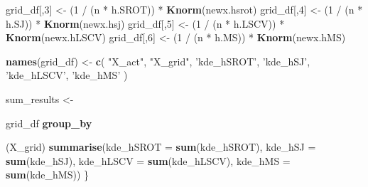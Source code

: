 \documentclass[]{article}
\newenvironment{Shaded}{\begin{snugshade}}{\end{snugshade}}
\newcommand{\KeywordTok}[1]{\textcolor[rgb]{0.13,0.29,0.53}{\textbf{{#1}}}}
\newcommand{\DataTypeTok}[1]{\textcolor[rgb]{0.13,0.29,0.53}{{#1}}}
\newcommand{\DecValTok}[1]{\textcolor[rgb]{0.00,0.00,0.81}{{#1}}}
\newcommand{\StringTok}[1]{\textcolor[rgb]{0.31,0.60,0.02}{{#1}}}
\newcommand{\NormalTok}[1]{{#1}}
\begin{document}
\begin{Shaded}
\begin{Highlighting}[]
        \NormalTok{grid_df[,}\DecValTok{3}\NormalTok{] <-}\StringTok{ }\NormalTok{(}\DecValTok{1} \NormalTok{/}\StringTok{ }\NormalTok{(n *}\StringTok{ }\NormalTok{h.SROT)) *}\StringTok{ }\KeywordTok{Knorm}\NormalTok{(newx.hsrot)}
        \NormalTok{grid_df[,}\DecValTok{4}\NormalTok{] <-}\StringTok{ }\NormalTok{(}\DecValTok{1} \NormalTok{/}\StringTok{ }\NormalTok{(n *}\StringTok{ }\NormalTok{h.SJ)) *}\StringTok{ }\KeywordTok{Knorm}\NormalTok{(newx.hsj)}
        \NormalTok{grid_df[,}\DecValTok{5}\NormalTok{] <-}\StringTok{ }\NormalTok{(}\DecValTok{1} \NormalTok{/}\StringTok{ }\NormalTok{(n *}\StringTok{ }\NormalTok{h.LSCV)) *}\StringTok{ }\KeywordTok{Knorm}\NormalTok{(newx.hLSCV)}
        \NormalTok{grid_df[,}\DecValTok{6}\NormalTok{] <-}\StringTok{ }\NormalTok{(}\DecValTok{1} \NormalTok{/}\StringTok{ }\NormalTok{(n *}\StringTok{ }\NormalTok{h.MS)) *}\StringTok{ }\KeywordTok{Knorm}\NormalTok{(newx.hMS)}
        
        
        \KeywordTok{names}\NormalTok{(grid_df) <-}\StringTok{ }\KeywordTok{c}\NormalTok{(}
            \StringTok{"X_act"}\NormalTok{, }
            \StringTok{"X_grid"}\NormalTok{, }
            \StringTok{'kde_hSROT'}\NormalTok{,}
            \StringTok{'kde_hSJ'}\NormalTok{,}
            \StringTok{'kde_hLSCV'}\NormalTok{,}
            \StringTok{'kde_hMS'}
        \NormalTok{)}
        
        
        \NormalTok{sum_results <-}\StringTok{ }
\StringTok{            }\NormalTok{grid_df %
\StringTok{            }\KeywordTok{group_by}\NormalTok{(X_grid) %
\StringTok{            }\KeywordTok{summarise}\NormalTok{(}\DataTypeTok{kde_hSROT =} \KeywordTok{sum}\NormalTok{(kde_hSROT),}
                      \DataTypeTok{kde_hSJ =} \KeywordTok{sum}\NormalTok{(kde_hSJ),}
                      \DataTypeTok{kde_hLSCV =} \KeywordTok{sum}\NormalTok{(kde_hLSCV),}
                      \DataTypeTok{kde_hMS =} \KeywordTok{sum}\NormalTok{(kde_hMS))}
    \NormalTok{\}}
    
}}
\end{Highlighting}
\end{Shaded}
\end{document}

